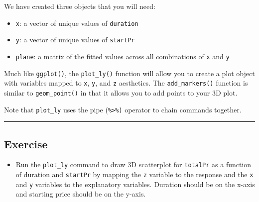 \documentclass[]{book}
\newenvironment{Shaded}{\begin{snugshade}}{\end{snugshade}}
\newcommand{\KeywordTok}[1]{\textcolor[rgb]{0.13,0.29,0.53}{\textbf{#1}}}
\newcommand{\DataTypeTok}[1]{\textcolor[rgb]{0.13,0.29,0.53}{#1}}
\newcommand{\FloatTok}[1]{\textcolor[rgb]{0.00,0.00,0.81}{#1}}
\newcommand{\StringTok}[1]{\textcolor[rgb]{0.31,0.60,0.02}{#1}}
\newcommand{\CommentTok}[1]{\textcolor[rgb]{0.56,0.35,0.01}{\textit{#1}}}
\newcommand{\OperatorTok}[1]{\textcolor[rgb]{0.81,0.36,0.00}{\textbf{#1}}}
\newcommand{\NormalTok}[1]{#1}
\providecommand{\tightlist}{%
  \setlength{\itemsep}{0pt}\setlength{\parskip}{0pt}}
\begin{document}
We have created three objects that you will need:

\begin{itemize}
\tightlist
\item
  \texttt{x}: a vector of unique values of \texttt{duration}
\item
  \texttt{y}: a vector of unique values of \texttt{startPr}
\item
  \texttt{plane}: a matrix of the fitted values across all combinations
  of \texttt{x} and \texttt{y}
\end{itemize}

Much like \texttt{ggplot()}, the \texttt{plot\_ly()} function will allow
you to create a plot object with variables mapped to \texttt{x},
\texttt{y}, and \texttt{z} aesthetics. The \texttt{add\_markers()}
function is similar to \texttt{geom\_point()} in that it allows you to
add points to your 3D plot.

Note that \texttt{plot\_ly} uses the pipe (\texttt{\%\textgreater{}\%)}
operator to chain commands together.

\begin{center}\rule{0.5\linewidth}{\linethickness}\end{center}

\subsection*{Exercise}\label{exercise-10}

\begin{itemize}
\tightlist
\item
  Run the \texttt{plot\_ly} command to draw 3D scatterplot for
  \texttt{totalPr} as a function of duration and \texttt{startPr} by
  mapping the \texttt{z} variable to the response and the \texttt{x} and
  \texttt{y} variables to the explanatory variables. Duration should be
  on the x-axis and starting price should be on the y-axis.
\end{itemize}

\begin{Shaded}
\end{Shaded}
\end{document}
